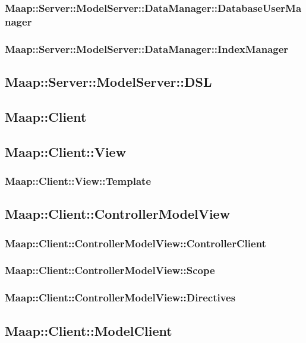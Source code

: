 \subsubsection{Maap::Server::ModelServer::DataManager::DatabaseUserManager}

\subsubsection{Maap::Server::ModelServer::DataManager::IndexManager}

\subsection{Maap::Server::ModelServer::DSL}

\subsection{Maap::Client}

\subsection{Maap::Client::View}

\subsubsection{Maap::Client::View::Template}

\subsection{Maap::Client::ControllerModelView}

\subsubsection{Maap::Client::ControllerModelView::ControllerClient}

\subsubsection{Maap::Client::ControllerModelView::Scope}

\subsubsection{Maap::Client::ControllerModelView::Directives}

\subsection{Maap::Client::ModelClient}

